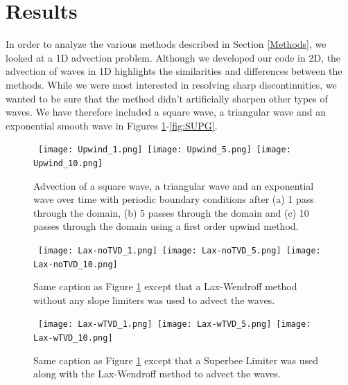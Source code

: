 \section{Results}
\label{results}
In order to analyze the various methods described in Section \ref{Methods}, we looked at a 1D advection problem. Although we developed our code in 2D, the advection of waves in 1D highlights the similarities and differences between the methods. While we were most interested in resolving sharp discontinuities, we wanted to be sure that the method didn't artificially sharpen other types of waves. We have therefore included a square wave, a triangular wave and an exponential smooth wave in Figures \ref{First_Order}-\ref{fig:SUPG}.

\begin{figure}[htbp]
\begin{center}
\mbox{
\texttt{[image: Upwind\_1.png]}
\texttt{[image: Upwind\_5.png]}
\texttt{[image: Upwind\_10.png]}
} 
\mbox{  
}
\caption{Advection of a square wave, a triangular wave and an exponential wave over time with periodic boundary conditions after (a) 1 pass through the domain, (b) 5 passes through the domain and (c) 10 passes through the domain using a first order upwind method.}
\label{First_Order}
\end{center}
\end{figure}

\begin{figure}[htbp]
\begin{center}
\mbox{
\texttt{[image: Lax-noTVD\_1.png]}
\texttt{[image: Lax-noTVD\_5.png]}
\texttt{[image: Lax-noTVD\_10.png]}
} 
\mbox{  
}
\caption{Same caption as Figure \ref{First_Order} except that a Lax-Wendroff method without any slope limiters was used to advect the waves.}
\label{fig:Lax-noTVD}
\end{center}
\end{figure}

\begin{figure}[htbp]
\begin{center}
\mbox{
\texttt{[image: Lax-wTVD\_1.png]}
\texttt{[image: Lax-wTVD\_5.png]}
\texttt{[image: Lax-wTVD\_10.png]}
} 
\mbox{  
}
\caption{Same caption as Figure \ref{First_Order} except that a Superbee Limiter was used along with the Lax-Wendroff method to advect the waves.}
\label{fig:Lax-wTVD}
\end{center}
\end{figure}


